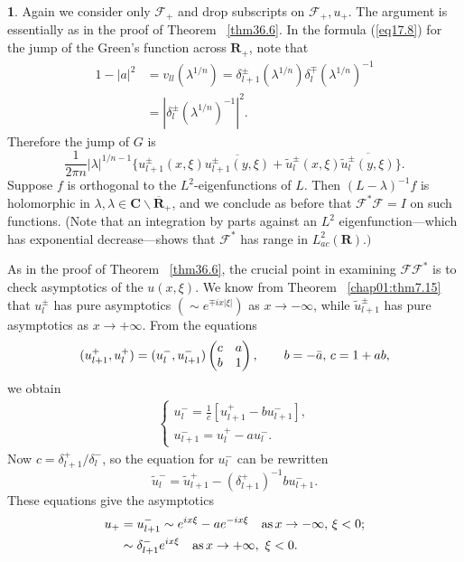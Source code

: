 \documentclass{surv-l}
\theoremstyle{plain}
\theoremstyle{definition}
\newtheorem*{sop}{\sc{Sketch of Proof}}
\numberwithin{equation}{chapter}
\begin{document}
\begin{sop} Again we consider only $\mathscr{F}_{+}$ and drop subscripts on $\mathscr{F}_{+},u_{+}$. The argument is essentially as in the proof of Theorem ~\ref{thm36.6}. In the formula (\ref{eq17.8}) for the jump of the Green's function across $\mathbf{R}_{+}$, note that
\begin{align*}
1-|a|^{2}&=v_{ll}(\lambda^{1/n})=\delta_{l+1}^{\pm}(\lambda^{1/n})\delta_{l}^{\mp}(\lambda^{1/n})^{-1}\\
&=|\delta_{l}^{\pm}(\lambda^{1/n})^{-1}|^{2}.
\end{align*}
Therefore the jump of $G$ is
\begin{equation*}
\frac{1}{2\pi n}|\lambda|^{1/n-1}\{u_{l+1}^{\pm}(x,\xi)\overline{u_{l+1}^{\pm}(y, \xi)}+\tilde{u}_{l}^{\pm}(x,\xi)\overline{\tilde{u}_{l}^{\pm}(y,\xi)}\}.
\end{equation*}
Suppose $f$ is orthogonal to the $L^{2}$-eigenfunctions of $L$. Then $(L-\lambda)^{-1}f$ is holomorphic in $\lambda, \lambda\in\mathbf{C}\backslash \overline{\mathbf{R}}_{+}$, and we conclude as before that $\mathscr{F}^{*}\mathscr{F}=I$ on such functions. (Note that an integration by parts against an $L^{2}$ eigenfunction---which has exponential decrease---shows that $\mathscr{F}^{*}$ has range in $L_{ac}^{2}(\mathbf{R}).)$

As in the proof of Theorem ~\ref{thm36.6}, the crucial point in examining $\mathscr{F}\!\!\mathscr{F}^{*}$ is to check asymptotics of the $u(x, \xi)$. We know from Theorem ~\ref{chap01:thm7.15} that $u_{l}^{\pm}$ has pure asymptotics $(\sim e^{\mp ix|\xi|})$ as $ x\rightarrow-\infty$, while $\tilde{u}_{l+1}^{\pm}$ has pure asymptotics as $x\rightarrow +\infty$. From the equations
\begin{equation}\label{eq36.28}
(u_{l+1}^{+}, u_{l}^{+})=(u_{l}^{-}, u_{l+1}^{-})\left(\begin{array}{@{}ll@{}}
c & a\\
b & 1
\end{array}\right),\qquad b=-\bar{a},\,c=1+ab,
\end{equation}
we obtain
\begin{align}\label{eq36.29}
\left\{\begin{array}{l}
u_{l}^{-}=\frac{1}{c}[u_{l+1}^{+}-bu_{l+1}^{-}],\\
u_{l+1}^{-}=u_{l}^{+}-au_{l}^{-}.
\end{array}\right.
\end{align}
Now $c=\delta_{l+1}^{+}/\delta_{l}^{-}$, so the equation for $u_{l}^{-}$ can be rewritten
\begin{equation*}
\tilde{u}_{l}^{-}=\tilde{u}_{l+1}^{+}-(\delta_{l+1}^{+})^{-1}bu_{l+1}^{-}.
\end{equation*}
These equations give the asymptotics
\begin{align}\label{eq36.30}
u_{+}&=u_{l+1}^{-}\sim e^{ix\xi}-ae^{-ix\xi}\quad \mathrm{as}\,x\rightarrow-\infty,\,\xi<0;\\
&\sim\delta_{l+1}^{-}e^{ix\xi}\quad \mathrm{as}\,x\rightarrow +\infty,\ \xi<0.\notag
\end{align}


\end{sop}
\end{document}

